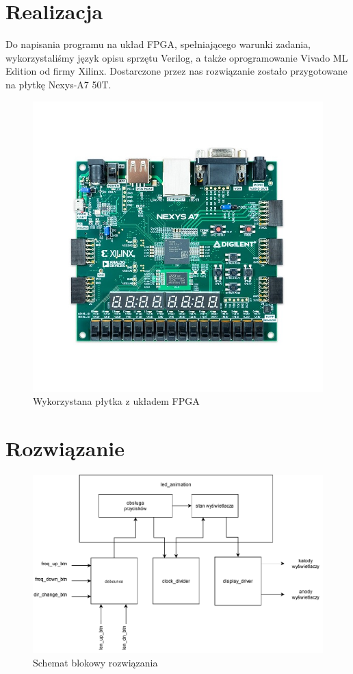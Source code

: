 \documentclass[a4paper]{article}
\begin{document}
\pagebreak
\section{Realizacja}
Do napisania programu na układ FPGA, spełniającego warunki zadania, wykorzystaliśmy język opisu sprzętu Verilog, a także
oprogramowanie Vivado ML Edition od firmy Xilinx.
Dostarczone przez nas rozwiązanie zostało przygotowane na płytkę Nexys-A7 50T.

\begin{figure}[H]
    \centering
    \includegraphics[width=\textwidth]{nexys-a7-artix-50t-fpga-xilinx-edu.jpg}
    \caption{Wykorzystana płytka z układem FPGA}
\end{figure}

\section{Rozwiązanie}
\begin{figure}[H]
    \centering
    \includegraphics[width=\textwidth]{led_animation.drawio.pdf}
    \caption{Schemat blokowy rozwiązania}
\end{figure}
\end{document}
